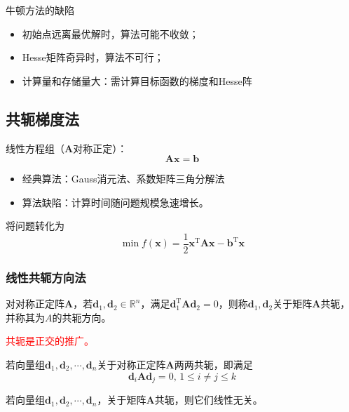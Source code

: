 \begin{note}
    牛顿方法的缺陷
    \begin{itemize}
        \item 初始点远离最优解时，算法可能不收敛；
        \item Hesse矩阵奇异时，算法不可行；
        \item  计算量和存储量大：需计算目标函数的梯度和Hesse阵
    \end{itemize}
\end{note}

\subsection{共轭梯度法}
线性方程组（$\boldsymbol{A}$对称正定）：
\[
    \boldsymbol{Ax} = \boldsymbol{b}
\]
\begin{itemize}
    \item 经典算法：Gauss消元法、系数矩阵三角分解法
    \item 算法缺陷：计算时间随问题规模急速增长。
\end{itemize}

将问题转化为
\[
    \min f(\boldsymbol{x}) = \dfrac{1}{2}\boldsymbol{x}^{\mathrm{T}}\boldsymbol{Ax}-\boldsymbol{b}^{\mathrm{T}}\boldsymbol{x}
\]

\subsubsection{线性共轭方向法}

\begin{definition}[共轭方向]
    对对称正定阵$\boldsymbol{A}$，若$\boldsymbol{d}_1,\boldsymbol{d}_2\in\mathbb{R}^n$，满足$\boldsymbol{d}_{1}^{\mathrm{T}}\boldsymbol{Ad}_2 = 0$，则称$\boldsymbol{d}_1,\boldsymbol{d}_2$关于矩阵$\boldsymbol{A}$共轭，并称其为$A$的共轭方向。

    \textcolor{red}{共轭是正交的推广。}
\end{definition}

\begin{definition}[线性共轭方向的推广]
    若向量组$\boldsymbol{d}_1,\boldsymbol{d}_2,\cdots,\boldsymbol{d}_n$关于对称正定阵$\boldsymbol{A}$两两共轭，即满足
    \[
        \boldsymbol{d}_i\boldsymbol{A}\boldsymbol{d}_j  = 0,\,1\leqslant i\neq j\leqslant k
    \]
\end{definition}
\begin{corollary}
    若向量组$\boldsymbol{d}_1,\boldsymbol{d}_2,\cdots,\boldsymbol{d}_n$，关于矩阵$\boldsymbol{A}$共轭，则它们线性无关。
\end{corollary}


